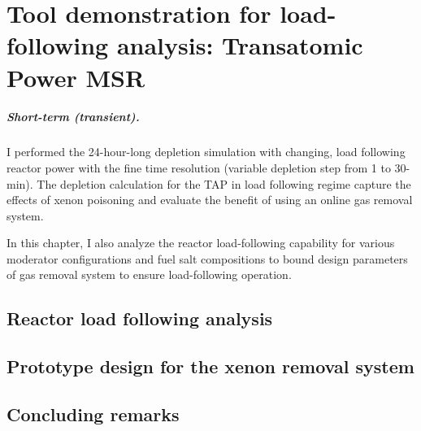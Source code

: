 \chapter{Tool demonstration for load-following analysis: Transatomic Power MSR}
\paragraph*{Short-term (transient).} I performed the 24-hour-long depletion 
simulation with changing, load following reactor power with the fine time 
resolution (variable depletion step from 1 to 30-min). The depletion 
calculation for the \gls{TAP} in load following regime capture the effects of 
xenon poisoning and evaluate the benefit of using an online gas removal system.

In this chapter, I also analyze the reactor load-following capability for 
various moderator configurations and fuel salt compositions to bound design 
parameters of gas removal system to ensure load-following operation. 
\section{Reactor load following analysis}

\section{Prototype design for the xenon removal system}

\section{Concluding remarks}